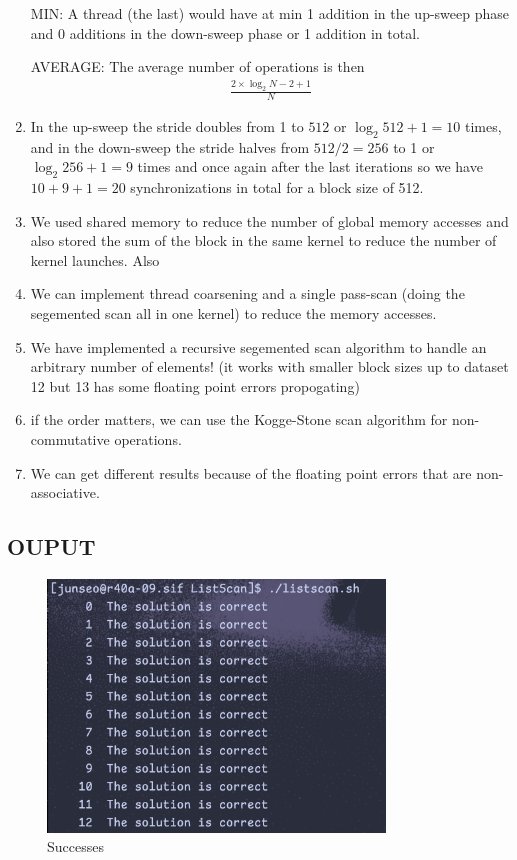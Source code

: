 \documentclass[../main.tex]{subfiles}
\begin{document}
\begin{enumerate}
    MIN: A thread (the last) would have at min 1 addition in the up-sweep phase and
    0 additions in the down-sweep phase or 1 addition in total.

    AVERAGE: The average number of operations is then
    \begin{align*}
        \frac{2 \times \log_2{N} - 2 + 1}{N}
    \end{align*}

    \item In the up-sweep the stride doubles from 1 to $512$ or $\log_2{512} + 1= 10$ times, and 
    in the down-sweep the stride halves from $512/2 = 256$ to 1 or $\log_2{256} + 1 = 9$ times and
    once again after the last iterations so we have $10 + 9 + 1 = 20$ synchronizations in total
    for a block size of 512.

    \item We used shared memory to reduce the number of global memory accesses and also stored
    the sum of the block in the same kernel to reduce the number of kernel launches. Also


    \item We can implement thread coarsening and a single pass-scan (doing the segemented scan all
    in one kernel) to reduce the memory accesses.

    \item We have implemented a recursive segemented scan algorithm to handle
    an arbitrary number of elements! (it works with smaller block sizes up to dataset 12
    but 13 has some floating point errors propogating)

    \item if the order matters, we can use the Kogge-Stone scan algorithm for non-commutative
    operations.

    \item We can get different results because of the floating point errors that are non-associative.
\end{enumerate}

\newpage
\subsection*{OUPUT}
\begin{figure}[ht]
    \centering
    \includegraphics[width=0.8\textwidth]{listscan.png}
    \caption{Successes}
    \label{fig:listscan}
\end{figure}
\end{document}
